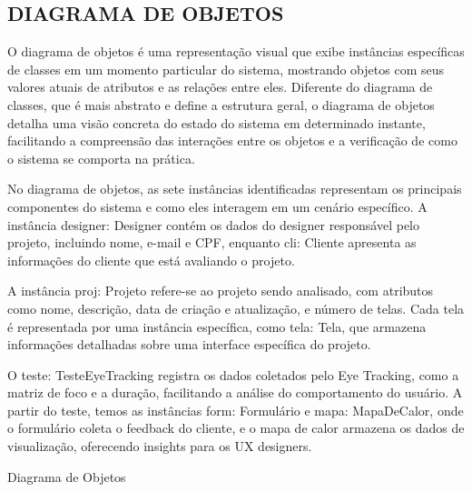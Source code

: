 \subsection*{DIAGRAMA DE OBJETOS}
O diagrama de objetos é uma representação visual que exibe instâncias específicas de classes em um momento particular do sistema, mostrando objetos com seus valores atuais de atributos e as relações entre eles. Diferente do diagrama de classes, que é mais abstrato e define a estrutura geral, o diagrama de objetos detalha uma visão concreta do estado do sistema em determinado instante, facilitando a compreensão das interações entre os objetos e a verificação de como o sistema se comporta na prática.

No diagrama de objetos, as sete instâncias identificadas representam os principais componentes do sistema e como eles interagem em um cenário específico. A instância designer: Designer contém os dados do designer responsável pelo projeto, incluindo nome, e-mail e CPF, enquanto cli: Cliente apresenta as informações do cliente que está avaliando o projeto.

A instância proj: Projeto refere-se ao projeto sendo analisado, com atributos como nome, descrição, data de criação e atualização, e número de telas. Cada tela é representada por uma instância específica, como tela: Tela, que armazena informações detalhadas sobre uma interface específica do projeto.

O teste: TesteEyeTracking registra os dados coletados pelo Eye Tracking, como a matriz de foco e a duração, facilitando a análise do comportamento do usuário. A partir do teste, temos as instâncias form: Formulário e mapa: MapaDeCalor, onde o formulário coleta o feedback do cliente, e o mapa de calor armazena os dados de visualização, oferecendo insights para os UX designers.\newline

\begin{photograph}[H]
    \centering
    \caption{Diagrama de Objetos}%
    \label{phot:pg-objetos}
    \end{photograph}
    
